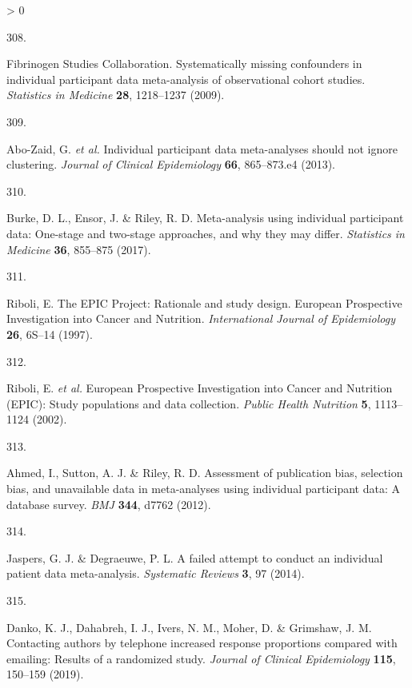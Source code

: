 \documentclass[a4paper, twoside]{templates/ociamthesis}
\newlength{\cslhangindent}
\newlength{\csllabelwidth}
\newenvironment{CSLReferences}[3] %
 {%
  \setlength{\parindent}{0pt}
  \ifodd #1 \everypar{\setlength{\hangindent}{\cslhangindent}}\ignorespaces\fi
  \ifnum #2 > 0
  \setlength{\parskip}{#2\baselineskip}
  \fi
 }%
 {}
\newcommand{\CSLLeftMargin}[1]{\parbox[t]{\maxof{\widthof{#1}}{\csllabelwidth}}{#1}}
\newcommand{\CSLRightInline}[1]{\parbox[t]{\linewidth - \csllabelwidth}{#1}}
\begin{document}
\begin{CSLReferences}{0}{0}
\leavevmode\hypertarget{ref-fibrinogenstudiescollaboration2009}{}%
\CSLLeftMargin{308. }
\CSLRightInline{Fibrinogen Studies Collaboration. Systematically missing confounders in individual participant data meta-analysis of observational cohort studies. \emph{Statistics in Medicine} \textbf{28}, 1218--1237 (2009).}

\leavevmode\hypertarget{ref-abo-zaid2013}{}%
\CSLLeftMargin{309. }
\CSLRightInline{Abo-Zaid, G. \emph{et al.} Individual participant data meta-analyses should not ignore clustering. \emph{Journal of Clinical Epidemiology} \textbf{66}, 865--873.e4 (2013).}

\leavevmode\hypertarget{ref-burke2017}{}%
\CSLLeftMargin{310. }
\CSLRightInline{Burke, D. L., Ensor, J. \& Riley, R. D. Meta-analysis using individual participant data: One-stage and two-stage approaches, and why they may differ. \emph{Statistics in Medicine} \textbf{36}, 855--875 (2017).}

\leavevmode\hypertarget{ref-riboli1997}{}%
\CSLLeftMargin{311. }
\CSLRightInline{Riboli, E. The {EPIC Project}: Rationale and study design. {European Prospective Investigation} into {Cancer} and {Nutrition}. \emph{International Journal of Epidemiology} \textbf{26}, 6S--14 (1997).}

\leavevmode\hypertarget{ref-riboli2002}{}%
\CSLLeftMargin{312. }
\CSLRightInline{Riboli, E. \emph{et al.} European {Prospective Investigation} into {Cancer} and {Nutrition} ({EPIC}): Study populations and data collection. \emph{Public Health Nutrition} \textbf{5}, 1113--1124 (2002).}

\leavevmode\hypertarget{ref-ahmed2012}{}%
\CSLLeftMargin{313. }
\CSLRightInline{Ahmed, I., Sutton, A. J. \& Riley, R. D. Assessment of publication bias, selection bias, and unavailable data in meta-analyses using individual participant data: A database survey. \emph{BMJ} \textbf{344}, d7762 (2012).}

\leavevmode\hypertarget{ref-jaspers2014}{}%
\CSLLeftMargin{314. }
\CSLRightInline{Jaspers, G. J. \& Degraeuwe, P. L. A failed attempt to conduct an individual patient data meta-analysis. \emph{Systematic Reviews} \textbf{3}, 97 (2014).}

\leavevmode\hypertarget{ref-danko2019}{}%
\CSLLeftMargin{315. }
\CSLRightInline{Danko, K. J., Dahabreh, I. J., Ivers, N. M., Moher, D. \& Grimshaw, J. M. Contacting authors by telephone increased response proportions compared with emailing: Results of a randomized study. \emph{Journal of Clinical Epidemiology} \textbf{115}, 150--159 (2019).}


\end{CSLReferences}
\end{document}
